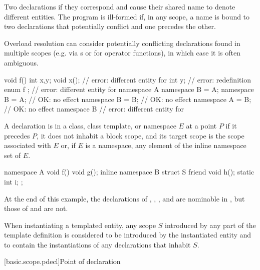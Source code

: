 \pnum
{}%
Two declarations 
if they correspond and
cause their shared name to denote different entities.
The program is ill-formed
if, in any scope, a name is bound to two declarations
that potentially conflict and one precedes the other.
\begin{note}
Overload resolution can consider potentially conflicting declarations
found in multiple scopes
(e.g. via s or for operator functions),
in which case it is often ambiguous.
\end{note}
\begin{example}
\begin{codeblock}
void f() {
  int x,y;
  void x();             // error: different entity for 
  int y;                // error: redefinition
}
enum { f };             // error: different entity for 
namespace A {}
namespace B = A;
namespace B = A;        // OK: no effect
namespace B = B;        // OK: no effect
namespace A = B;        // OK: no effect
namespace B {}          // error: different entity for 
\end{codeblock}
\end{example}

\pnum
{}%
A declaration is 
in a class, class template, or namespace $E$ at a point $P$ if
it precedes $P$,
it does not inhabit a block scope, and
its target scope is the scope associated with $E$ or,
if $E$ is a namespace,
any element of the inline namespace set of $E$.
\begin{example}
\begin{codeblock}
namespace A {
  void f() {void g();}
  inline namespace B {
    struct S {
      friend void h();
      static int i;
    };
  }
}
\end{codeblock}
At the end of this example,
the declarations of , , , and 
are nominable in , but those of  and  are not.
\end{example}

\pnum
When instantiating a templated entity,
any scope $S$ introduced by any part of the template definition is considered
to be introduced by the instantiated entity and
to contain the instantiations of any declarations that inhabit $S$.

[basic.scope.pdecl]{Point of declaration}

